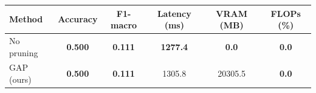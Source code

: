\begin{tabular}{lccccc}
\toprule
Method & Accuracy & F1-macro & Latency (ms) & VRAM (MB) & FLOPs (\%) \\
\midrule
No pruning & \textbf{0.500} & \textbf{0.111} & \textbf{1277.4} & \textbf{0.0} & \textbf{0.0} \\
GAP (ours) & \textbf{0.500} & \textbf{0.111} & 1305.8 & 20305.5 & \textbf{0.0} \\
\bottomrule
\end{tabular}
